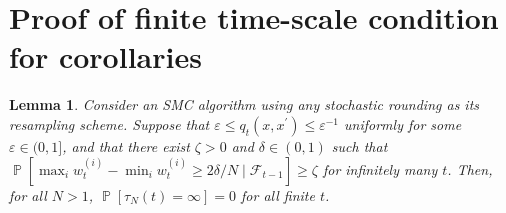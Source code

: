 \documentclass{article} %
\newtheorem{lemma}{Lemma}
\theoremstyle{definition}
\DeclareMathOperator{\Prob}{\mathbb{P}}
\newcommand{\1}[1]{\mathbbm{1}_{\{#1\}}}
\begin{document}
\section{Proof of finite time-scale condition for corollaries}\label{app:finiteness}

\begin{lemma}\label{thm:SR_nontriviality}
Consider an SMC algorithm using any stochastic rounding as its resampling scheme.
Suppose that $\varepsilon \leq q_t(x, x^\prime) \leq \varepsilon^{-1}$ uniformly for some $\varepsilon \in (0,1]$, and that there exist $\zeta >0$ and $\delta \in (0,1)$ such that $\Prob[ \max_i w_t^{(i)} - \min_i w_t^{(i)} \geq 2\delta/N \mid \mathcal{F}_{t-1} ] \geq \zeta$ for infinitely many $t$. Then, for all $N>1$, $\Prob[ \tau_N(t) = \infty ] =0$ for all finite $t$.
\end{lemma}
\end{document}
